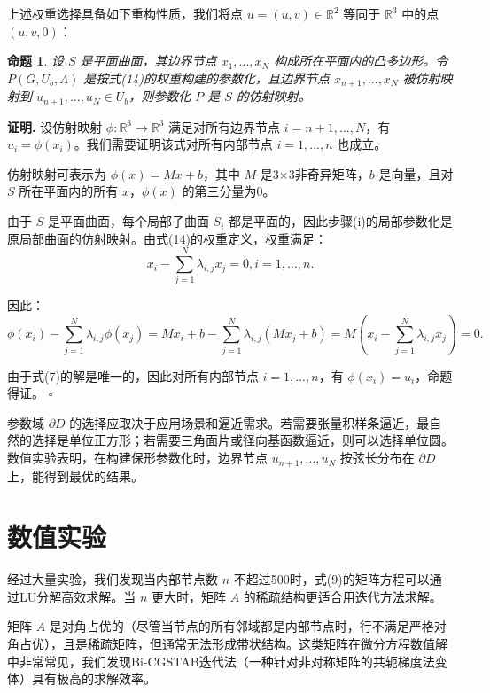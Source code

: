 \documentclass{ctexart}
\newtheorem{proposition}{命题}
\theoremstyle{proof}
\newenvironment{proof}{\noindent\textbf{证明.}}{\hfill$\square$\par}
\begin{document}
上述权重选择具备如下重构性质，我们将点 $u=(u,v) \in \mathbb{R}^2$ 等同于 $\mathbb{R}^3$ 中的点 $(u,v,0)$：

\begin{proposition}
设 $S$ 是平面曲面，其边界节点 $x_1,...,x_N$ 构成所在平面内的凸多边形。令 $P(G,U_b,\Lambda)$ 是按式(14)的权重构建的参数化，且边界节点 $x_{n+1},...,x_N$ 被仿射映射到 $u_{n+1},...,u_N \in U_b$，则参数化 $P$ 是 $S$ 的仿射映射。
\end{proposition}

\begin{proof}
设仿射映射 $\phi: \mathbb{R}^3 \to \mathbb{R}^3$ 满足对所有边界节点 $i=n+1,...,N$，有 $u_i=\phi(x_i)$。我们需要证明该式对所有内部节点 $i=1,...,n$ 也成立。

仿射映射可表示为 $\phi(x)=Mx+b$，其中 $M$ 是3×3非奇异矩阵，$b$ 是向量，且对 $S$ 所在平面内的所有 $x$，$\phi(x)$ 的第三分量为0。

由于 $S$ 是平面曲面，每个局部子曲面 $S_i$ 都是平面的，因此步骤(i)的局部参数化是原局部曲面的仿射映射。由式(14)的权重定义，权重满足：
\[
x_{i}-\sum _{j=1}^{N}\lambda _{i, j} x_{j}=0, i=1, ..., n .
\]

因此：
\[
\phi\left(x_{i}\right)-\sum_{j=1}^{N} \lambda_{i, j} \phi\left(x_{j}\right)=M x_{i}+b-\sum_{j=1}^{N} \lambda_{i, j}\left(M x_{j}+b\right)=M\left(x_{i}-\sum_{j=1}^{N} \lambda_{i, j} x_{j}\right)=0 .
\]

由于式(7)的解是唯一的，因此对所有内部节点 $i=1,...,n$，有 $\phi(x_i)=u_i$，命题得证。
\end{proof}

参数域 $\partial D$ 的选择应取决于应用场景和逼近需求。若需要张量积样条逼近，最自然的选择是单位正方形；若需要三角面片或径向基函数逼近，则可以选择单位圆。数值实验表明，在构建保形参数化时，边界节点 $u_{n+1},...,u_N$ 按弦长分布在 $\partial D$ 上，能得到最优的结果。

\section{数值实验}
经过大量实验，我们发现当内部节点数 $n$ 不超过500时，式(9)的矩阵方程可以通过LU分解\cite{golub1989}高效求解。当 $n$ 更大时，矩阵 $A$ 的稀疏结构更适合用迭代方法求解。

矩阵 $A$ 是对角占优的（尽管当节点的所有邻域都是内部节点时，行不满足严格对角占优），且是稀疏矩阵，但通常无法形成带状结构。这类矩阵在微分方程数值解中非常常见，我们发现Bi-CGSTAB迭代法\cite{vandervorst1992}（一种针对非对称矩阵的共轭梯度法变体）具有极高的求解效率。
\end{document}
